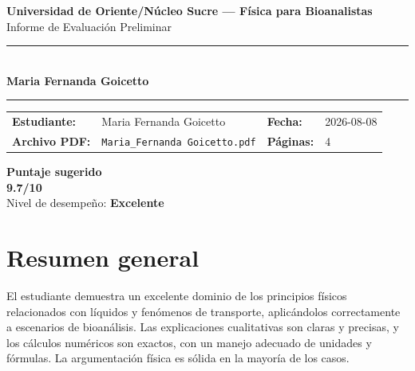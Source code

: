 \documentclass[11pt,a4paper]{article}
\begin{document}
\begin{center}
  {\Large\bfseries\color{azulTitulo} Universidad de Oriente/Núcleo Sucre --- Física para Bioanalistas}\\[4pt]
  {\large Informe de Evaluación Preliminar}\\[12pt]
  \rule{\linewidth}{1.2pt}\\[6pt]
  {\LARGE\bfseries Maria Fernanda Goicetto}\\[4pt]
  \rule{\linewidth}{0.6pt}
\end{center}

\vspace{4pt}
\begin{tcolorbox}[cajaTitulo, title=Datos del informe]
\begin{tabular}{@{}llll@{}}
  \textbf{Estudiante:}  & Maria Fernanda Goicetto  &
  \textbf{Fecha:}       & 2026-08-08 \\[4pt]
  \textbf{Archivo PDF:} & \texttt{Maria\_Fernanda Goicetto.pdf}  &
  \textbf{Páginas:}     & 4 \\
\end{tabular}
\end{tcolorbox}

\vspace{6pt}
\begin{center}
  \begin{tcolorbox}[
    enhanced,
    colback=white, colframe=desempeno_excelente,
    width=0.62\linewidth,
    boxrule=2pt,
    halign=center, valign=center,
    top=8pt, bottom=8pt,
  ]
    \centering
    {\large\bfseries Puntaje sugerido}\\[6pt]
    {\Huge\bfseries\color{desempeno_excelente} 9.7/10}\\[6pt]
    {\large Nivel de desempeño: \textbf{\color{desempeno_excelente} Excelente}}
  \end{tcolorbox}
\end{center}

\section*{Resumen general}
El estudiante demuestra un excelente dominio de los principios físicos relacionados con líquidos y fenómenos de transporte, aplicándolos correctamente a escenarios de bioanálisis. Las explicaciones cualitativas son claras y precisas, y los cálculos numéricos son exactos, con un manejo adecuado de unidades y fórmulas. La argumentación física es sólida en la mayoría de los casos.
\end{document}
